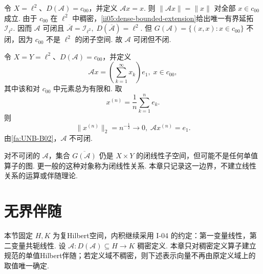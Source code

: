 \begin{FAExample}[可闭但不闭的稠密定义算子]
令 \(\displaystyle X=\ell^2\)、\(\displaystyle D(\mathcal A)=c_{00}\)，并定义
\(\displaystyle \mathcal Ax=x.\)
则 \(\displaystyle\|\mathcal Ax\|=\|x\|\) 对全部 \(\displaystyle x\in c_{00}\) 成立. 由于 \(\displaystyle c_{00}\) 在 \(\displaystyle\ell^2\) 中稠密，\autoref{ii05:dense-bounded-extension}给出唯一有界延拓 \(\displaystyle\mathcal I_{\ell^2}\). 因而 \(\displaystyle\mathcal A\) 可闭且
\(\displaystyle \overline{\mathcal A}=\mathcal I_{\ell^2}, \; D(\overline{\mathcal A})=\ell^2.\)
但 \(\displaystyle G(\mathcal A)=\{(x,x):x\in c_{00}\}\) 不闭，因为 \(\displaystyle c_{00}\) 不是 \(\displaystyle\ell^2\) 的闭子空间. 故 \(\displaystyle\mathcal A\) 可闭但不闭.
\end{FAExample}

\begin{FACounterexample}[稠密定义但不可闭]
令 \(\displaystyle X=Y=\ell^2\)、\(\displaystyle D(\mathcal A)=c_{00}\)，并定义
\[
\mathcal Ax
=
\left(\sum_{k=1}^{\infty}x_k\right)e_1,
\;
x\in c_{00},
\]
其中该和对 \(\displaystyle c_{00}\) 中元素总为有限和. 取
\[
x^{(n)}=\frac1n\sum_{k=1}^{n}e_k.
\]
则
\[
\|x^{(n)}\|_2=n^{-\frac{1}{2}}\longrightarrow0,
\;
\mathcal Ax^{(n)}=e_1.
\]
由\autoref{fa:UNB-B02}，\(\displaystyle\mathcal A\) 不可闭.
\end{FACounterexample}

\begin{FARemark}[闭线性关系的边界]
对不可闭的 \(\displaystyle\mathcal A\)，集合 \(\displaystyle\overline{G(\mathcal A)}\) 仍是 \(\displaystyle X\times Y\) 的闭线性子空间，但可能不是任何单值算子的图. 更一般的这种对象称为闭线性关系. 本章只记录这一边界，不建立线性关系的运算或伴随理论.
\end{FARemark}

\section{无界伴随}\label{sec:ii05-unbounded-adjoint}

本节固定 \(\displaystyle H,K\) 为复Hilbert空间，内积继续采用 I-04 的约定：第一变量线性，第二变量共轭线性. 设
\(\displaystyle \mathcal A:D(\mathcal A)\subseteq H\to K\)
稠密定义. 本章只对稠密定义算子建立规范的单值Hilbert伴随；若定义域不稠密，则下述表示向量不再由原定义域上的取值唯一确定.

